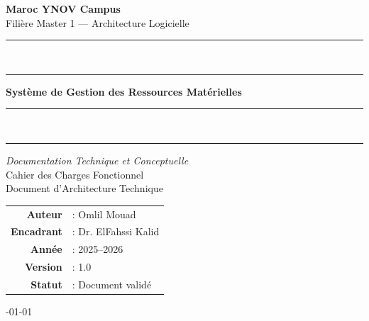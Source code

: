 \documentclass[12pt,a4paper]{report}
\begin{document}
\begin{titlepage}
    \noindent
    \textbf{\large Maroc YNOV Campus}\\[0.3cm]
    Filière Master 1 --- Architecture Logicielle\\[0.1cm]
    
    \noindent\rule{\textwidth}{1pt}\vspace{-0.8em}\\
    \noindent\rule{\textwidth}{0.5pt}

    \vspace{1.5cm}

    \noindent
    \textbf{\Large Système de Gestion des Ressources Matérielles}\\[0.1cm]
    
    \noindent\rule{\textwidth}{1pt}\vspace{-0.8em}\\
    \noindent\rule{\textwidth}{0.5pt}

    \vspace{1cm}

    \noindent
    \textit{Documentation Technique et Conceptuelle}\\[0.5cm]
    Cahier des Charges Fonctionnel\\
    Document d'Architecture Technique

    \vspace{2.5cm}

    \hfill
    \begin{minipage}{0.55\textwidth}
        \renewcommand{\arraystretch}{1.2} %
        \begin{tabular}{r l}
            \textbf{Auteur}    & : Omlil Mouad \\
            \textbf{Encadrant} & : Dr. ElFahssi Kalid \\[0.3cm] %
            \textbf{Année}     & : 2025--2026 \\
            \textbf{Version}   & : 1.0 \\
            \textbf{Statut}    & : Document validé \\
        \end{tabular}
    \end{minipage}

    \vfill

    -01-01 %
\end{titlepage}
\end{document}
